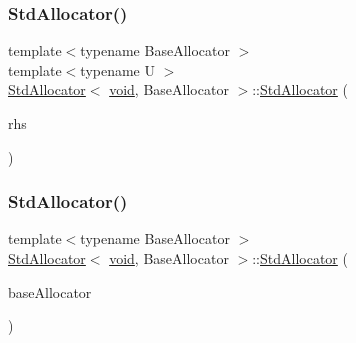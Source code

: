 \subsubsection{\texorpdfstring{Std\+Allocator()}{StdAllocator()}\hspace{0.1cm}{\footnotesize\ttfamily [3/4]}}
{\footnotesize\ttfamily template$<$typename Base\+Allocator $>$ \\
template$<$typename U $>$ \\
\hyperlink{classStdAllocator}{Std\+Allocator}$<$ \hyperlink{imgui__impl__opengl3__loader_8h_ac668e7cffd9e2e9cfee428b9b2f34fa7}{void}, Base\+Allocator $>$\+::\hyperlink{classStdAllocator}{Std\+Allocator} (\begin{DoxyParamCaption}\item[{const \hyperlink{classStdAllocator}{Std\+Allocator}$<$ U, Base\+Allocator $>$ \&}]{rhs }\end{DoxyParamCaption})\hspace{0.3cm}{\ttfamily [inline]}}

\mbox{\label{classStdAllocator_3_01void_00_01BaseAllocator_01_4_a8ee693f821d2a7209947faab4a77e304}} 
\subsubsection{\texorpdfstring{Std\+Allocator()}{StdAllocator()}\hspace{0.1cm}{\footnotesize\ttfamily [4/4]}}
{\footnotesize\ttfamily template$<$typename Base\+Allocator $>$ \\
\hyperlink{classStdAllocator}{Std\+Allocator}$<$ \hyperlink{imgui__impl__opengl3__loader_8h_ac668e7cffd9e2e9cfee428b9b2f34fa7}{void}, Base\+Allocator $>$\+::\hyperlink{classStdAllocator}{Std\+Allocator} (\begin{DoxyParamCaption}\item[{const Base\+Allocator \&}]{base\+Allocator }\end{DoxyParamCaption})\hspace{0.3cm}{\ttfamily [inline]}}

\mbox{\label{classStdAllocator_3_01void_00_01BaseAllocator_01_4_a223afcc6a4765478ca3c89f1164913d4}} 
